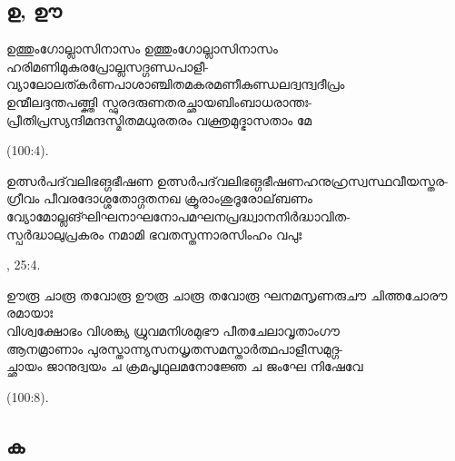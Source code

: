 \subsection{ഉ, ഊ}

\begin{enumerate}




\begin{slokam}{\VSr}{\Melp}{ഉത്തുംഗോല്ലാസിനാസം}
ഉത്തുംഗോല്ലാസിനാസം ഹരിമണിമുകുരപ്രോല്ലസദ്ഗണ്ഡപാളീ-\\
വ്യാലോലത്കർണപാശാഞ്ചിതമകരമണീകുണ്ഡലദ്വന്ദ്വദീപ്രം\\
ഉന്മീലദ്ദന്തപങ്ങ്ക്തി സ്ഫുരദരുണതരച്ഛായബിംബാധരാന്തഃ-\\
പ്രീതിപ്രസ്യന്ദിമന്ദസ്മിതമധുരതരം വക്ത്രമുദ്ഭാസതാം മേ
\end{slokam}


 (100:4).



\begin{slokam}{\VSv}{\Unk}{ഉത്സര്‍പദ്‌വലിഭങ്ഗഭീഷണ}
ഉത്സര്‍പദ്‌വലിഭങ്ഗഭീഷണഹനുഹ്രസ്വസ്ഥവീയസ്തര-\\
ഗ്രീവം പീവരദോശ്ശതോദ്ഗതനഖ ക്രൂരാംശുദൂരോല്‌ബണം\\
വ്യോമോല്ലങ്ഘിഘനാഘനോപമഘനപ്രദ്ധ്വാനനിര്‍ദ്ധാവിത-\\
സ്പര്‍ദ്ധാലുപ്രകരം നമാമി ഭവതസ്തന്നാരസിംഹം വപുഃ
\end{slokam}


, 25:4.

\begin{slokam}{\VSr}{\Melp}{ഊരൂ ചാരൂ തവോരൂ}
ഊരൂ ചാരൂ തവോരൂ ഘനമസൃണരുചൗ ചിത്തചോരൗ രമായാഃ \\
വിശ്വക്ഷോഭം വിശങ്ക്യ ധ്രുവമനിശമുഭൗ പീതചേലാവൃതാംഗൗ\\
ആനമ്രാണാം പുരസ്താന്ന്യസനധൃതസമസ്താർത്ഥപാളീസമുദ്ഗ-\\
ച്ഛായം ജാനുദ്വയം ച ക്രമപൃഥുലമനോജ്ഞേ ച ജംഘേ നിഷേവേ
\end{slokam}


 (100:8).


\end{enumerate}
\subsection{ക}

